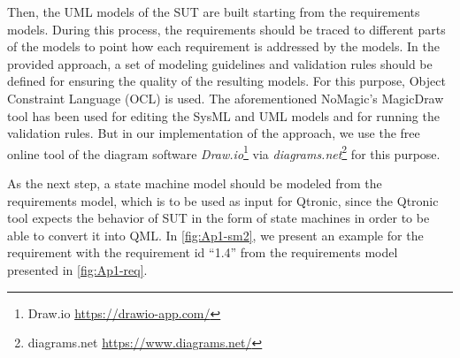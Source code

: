 Then, the UML models of the SUT are built starting from the requirements models. During this process, the requirements should be traced to different parts of the models to point how each requirement is addressed by the models. In the provided approach, a set of modeling guidelines and validation rules should be defined for ensuring the quality of the resulting models. For this purpose, Object Constraint Language (OCL) is used. The aforementioned NoMagic’s MagicDraw tool has been used for editing the SysML and UML models and for running the validation rules. But in our implementation of the approach, we use the free online tool of the diagram software \textit{Draw.io}\footnote{Draw.io \url{https://drawio-app.com/}} via \textit{diagrams.net}\footnote{diagrams.net \url{https://www.diagrams.net/}} for this purpose.

As the next step, a state machine model should be modeled from the requirements model, which is to be used as input for Qtronic, since the Qtronic tool expects the behavior of SUT in the form of state machines in order to be able to convert it into QML. %
In \autoref{fig:Ap1-sm2}, we present an example for the requirement with the requirement id \enquote{1.4} from the requirements model presented in \autoref{fig:Ap1-req}.

